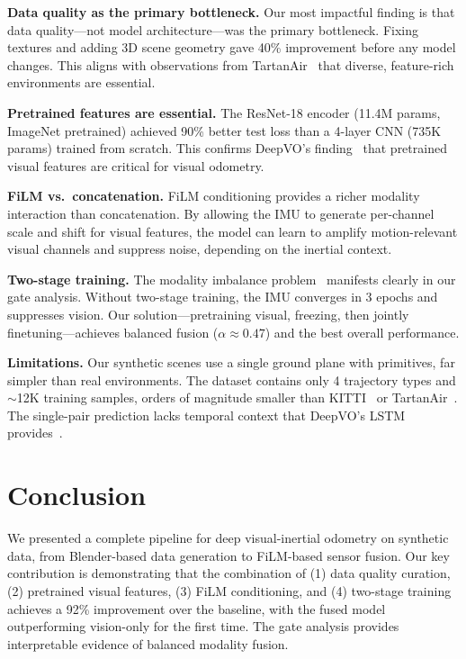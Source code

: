 \documentclass[conference]{IEEEtran}
\begin{document}
\textbf{Data quality as the primary bottleneck.} Our most impactful finding is that data quality---not model architecture---was the primary bottleneck. Fixing textures and adding 3D scene geometry gave 40\% improvement before any model changes. This aligns with observations from TartanAir~\cite{wang2020tartanair} that diverse, feature-rich environments are essential.

\textbf{Pretrained features are essential.} The ResNet-18 encoder (11.4M params, ImageNet pretrained) achieved 90\% better test loss than a 4-layer CNN (735K params) trained from scratch. This confirms DeepVO's finding~\cite{wang2017} that pretrained visual features are critical for visual odometry.

\textbf{FiLM vs.\ concatenation.} FiLM conditioning provides a richer modality interaction than concatenation. By allowing the IMU to generate per-channel scale and shift for visual features, the model can learn to amplify motion-relevant visual channels and suppress noise, depending on the inertial context.

\textbf{Two-stage training.} The modality imbalance problem~\cite{wang2020multimodal} manifests clearly in our gate analysis. Without two-stage training, the IMU converges in 3 epochs and suppresses vision. Our solution---pretraining visual, freezing, then jointly finetuning---achieves balanced fusion ($\alpha \approx 0.47$) and the best overall performance.

\textbf{Limitations.} Our synthetic scenes use a single ground plane with primitives, far simpler than real environments. The dataset contains only 4 trajectory types and $\sim$12K training samples, orders of magnitude smaller than KITTI~\cite{geiger2012} or TartanAir~\cite{wang2020tartanair}. The single-pair prediction lacks temporal context that DeepVO's LSTM provides~\cite{wang2017}.

\section{Conclusion}

We presented a complete pipeline for deep visual-inertial odometry on synthetic data, from Blender-based data generation to FiLM-based sensor fusion. Our key contribution is demonstrating that the combination of (1) data quality curation, (2) pretrained visual features, (3) FiLM conditioning, and (4) two-stage training achieves a 92\% improvement over the baseline, with the fused model outperforming vision-only for the first time. The gate analysis provides interpretable evidence of balanced modality fusion.
\end{document}
